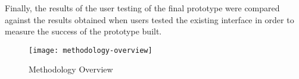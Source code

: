 Finally, the results of the user testing of the final prototype were compared against the results obtained when users tested the existing interface in order to measure the success of the prototype built.

\begin{figure}[htbp]
	\centering
	\texttt{[image: methodology-overview]}
	\caption{Methodology Overview}
	\label{fig:methodologyOverview}
\end{figure}